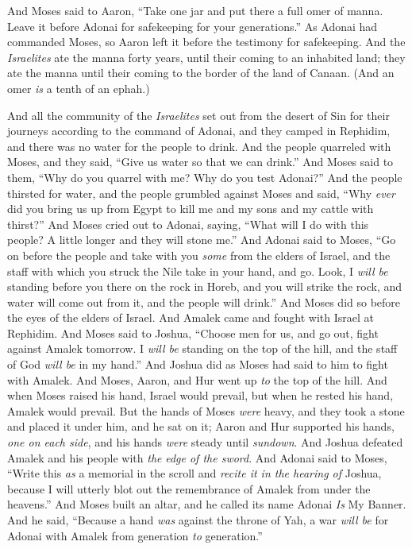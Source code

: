 \begin{biblechapter}
\verse And Moses said to Aaron, “Take one jar and put there a full omer of manna. Leave it before Adonai for safekeeping for your generations.”
\verse As Adonai had commanded Moses, so Aaron left it before the testimony for safekeeping.
\verse And the \textit{Israelites} ate the manna forty years, until their coming to an inhabited land; they ate the manna until their coming to the border of the land of Canaan.
\verse (And an omer \textit{is} a tenth of an ephah.)
\end{biblechapter}

\begin{biblechapter} %
 And all the community of the \textit{Israelites} set out from the desert of Sin for their journeys according to the command of Adonai, and they camped in Rephidim, and there was no water for the people to drink.
\verse And the people quarreled with Moses, and they said, “Give us water so that we can drink.” And Moses said to them, “Why do you quarrel with me? Why do you test Adonai?”
\verse And the people thirsted for water, and the people grumbled against Moses and said, “Why \textit{ever} did you bring us up from Egypt to kill me and my sons and my cattle with thirst?”
\verse And Moses cried out to Adonai, saying, “What will I do with this people? A little longer and they will stone me.”
\verse And Adonai said to Moses, “Go on before the people and take with you \textit{some} from the elders of Israel, and the staff with which you struck the Nile take in your hand, and go.
\verse Look, I \textit{will be} standing before you there on the rock in Horeb, and you will strike the rock, and water will come out from it, and the people will drink.”
\verse And Moses did so before the eyes of the elders of Israel.
 And Amalek came and fought with Israel at Rephidim.
\verse And Moses said to Joshua, “Choose men for us, and go out, fight against Amalek tomorrow. I \textit{will be} standing on the top of the hill, and the staff of God \textit{will be} in my hand.”
\verse And Joshua did as Moses had said to him to fight with Amalek. And Moses, Aaron, and Hur went up \textit{to} the top of the hill.
\verse And when Moses raised his hand, Israel would prevail, but when he rested his hand, Amalek would prevail.
\verse But the hands of Moses \textit{were} heavy, and they took a stone and placed it under him, and he sat on it; Aaron and Hur supported his hands, \textit{one on each side}, and his hands \textit{were} steady until \textit{sundown}.
\verse And Joshua defeated Amalek and his people with \textit{the} \textit{edge of the sword}.
\verse And Adonai said to Moses, “Write this \textit{as} a memorial in the scroll and \textit{recite it in the hearing of} Joshua, because I will utterly blot out the remembrance of Amalek from under the heavens.”
\verse And Moses built an altar, and he called its name Adonai \textit{Is} My Banner.
\verse And he said, “Because a hand \textit{was} against the throne of Yah, a war \textit{will be} for Adonai with Amalek from generation \textit{to} generation.”
\end{biblechapter}


